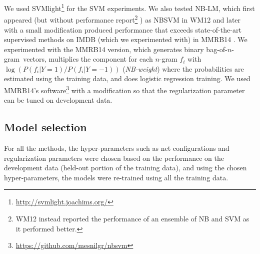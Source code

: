 \documentclass[11pt,letterpaper]{article}
\makeatletter
\newcommand{\bongram}{bag-of-$n$-gram}
\newcommand{\nbw}{NB-LM}
\newcommand\tightpara{\@startsection{paragraph}{4}{\z@}{1ex plus
   0ex minus 0.2ex}{-1em}{\normalsize\bf}}
\makeatother
\begin{document}
We used SVMlight\footnote{
  \url{http://svmlight.joachims.org/}
}
for the SVM experiments.  
\tightpara{\nbw}
We also tested \nbw, which first appeared (but without performance report\footnote{
  WM12 instead reported the performance of an ensemble of NB and SVM as it performed better.  
}
) as NBSVM in WM12 \cite{WM12} and later with a small modification 
produced 
performance that exceeds state-of-the-art supervised methods 
on IMDB (which we experimented with) 
in MMRB14 \cite{MMRB14}.  
We experimented with the MMRB14 version, which 
generates binary \bongram\ vectors, multiplies the component 
for each $n$-gram $f_i$ with $\log(P(f_i|Y=1)/P(f_i|Y=-1))$
({\em NB-weight}) where the probabilities are estimated using the training data, 
and does logistic regression training.  
We used MMRB14's software\footnote{
  \url{https://github.com/mesnilgr/nbsvm}
} with a modification so that the regularization parameter
can be tuned on development data.  

\subsection{Model selection}
\label{sec:protocol}
For all the methods, 
the hyper-parameters such as net configurations and 
regularization parameters were chosen 
based on the performance on the development data (held-out portion of the training data), 
and using the chosen hyper-parameters, the models were re-trained using all the training 
data.   
\end{document}
